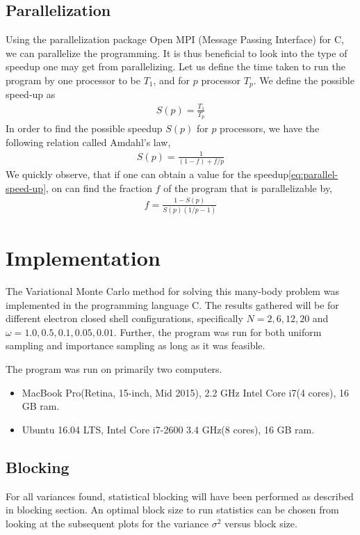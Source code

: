 \documentclass[11pt]{article}
\newcommand{\CC}{C\nolinebreak\hspace{-.05em}\raisebox{.4ex}{\tiny\bf +}\nolinebreak\hspace{-.10em}\raisebox{.4ex}{\tiny\bf +}}
\def\CC{{C\nolinebreak[4]\hspace{-.05em}\raisebox{.4ex}{\tiny\bf ++}}}
\begin{document}
\subsection{Parallelization}
Using the parallelization package Open MPI (Message Passing Interface) for \CC, we can parallelize the programming. It is thus beneficial to look into the type of speedup one may get from parallelizing. Let us define the time taken to run the program by one processor to be $T_1$, and for $p$ processor $T_p$. We define the possible speed-up as
\begin{align}
	S(p) = \frac{T_1}{T_p}
	\label{eq:parallel-speed-up}
\end{align}
In order to find the possible speedup $S(p)$ for $p$ processors, we have the following relation called Amdahl's law\cite{Amdahl:1967:VSP:1465482.1465560},
\begin{align}
	S(p) = \frac{1}{(1-f) + f/p}
	\label{eq:amdahls-law}
\end{align}
We quickly observe, that if one can obtain a value for the speedup\eqref{eq:parallel-speed-up}, on can find the fraction $f$ of the program that is parallelizable by,
\begin{align}
	f = \frac{1-S(p)}{S(p)(1/p-1)}
	\label{eq:f-parallelizable-fraction}
\end{align}

\section{Implementation}
The Variational Monte Carlo method for solving this many-body problem was implemented in the programming language \CC. The results gathered will be for different electron closed shell configurations, specifically $N = 2, 6, 12, 20$ and $\omega = 1.0, 0.5, 0.1, 0.05, 0.01$. Further, the program was run for both uniform sampling and importance sampling as long as it was feasible.

The program was run on primarily two computers.
\begin{itemize}
	\item MacBook Pro(Retina, 15-inch, Mid 2015), 2.2 GHz Intel Core i7(4 cores), 16 GB ram.
	\item Ubuntu 16.04 LTS, Intel Core i7-2600 3.4 GHz(8 cores), 16 GB ram.
\end{itemize}

\subsection{Blocking}
For all variances found, statistical blocking will have been performed as described in blocking section. An optimal block size to run statistics can be chosen from looking at the subsequent plots for the variance $\sigma^2$ versus block size.
\end{document}
